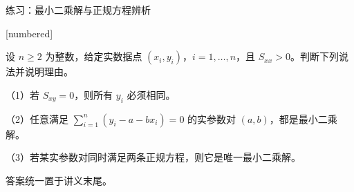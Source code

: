 \documentclass[aspectratio=169,10pt,fontset=fandol]{ctexbeamer}
\makeatletter
\newcommand{\mathagentexerciselabelcontext}[1]{%
\hypertarget<1>{#1}{}%
\edef\@currentHref{#1}%
}
\makeatother
\begin{document}
\begin{frame}[t,fragile]{练习：最小二乘解与正规方程辨析}
\normalsize
{\normalsize
[numbered]
\mathagentexerciselabelcontext{mathagent.exercise.U0029.0}
\begin{exercise}
\label{mathagent:exercise:b4c9c9a1fb82bcef052fdbf6e1539831ed88cee016dbcbf83a50e5e8d2311be0}
设 $n\geq2$ 为整数，给定实数据点 $(x_i,y_i)$，$i=1,\ldots,n$，且 $S_{xx}>0$。判断下列说法并说明理由。

（1）若 $S_{xy}=0$，则所有 $y_i$ 必须相同。

（2）任意满足 $\sum_{i=1}^{n}(y_i-a-bx_i)=0$ 的实参数对 $(a,b)$，都是最小二乘解。

（3）若某实参数对同时满足两条正规方程，则它是唯一最小二乘解。

答案统一置于讲义末尾。
\end{exercise}
}
\end{frame}
\end{document}
